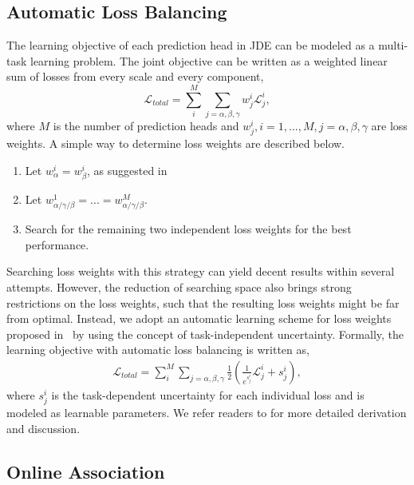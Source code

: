 \documentclass[runningheads]{llncs}
\begin{document}
\subsection{Automatic Loss Balancing}
\label{sec:lossbalancing}
The learning objective of each prediction head in JDE can be modeled as a multi-task learning problem. The joint objective can be written as a weighted linear sum of losses from every scale and every component,
\begin{equation}
    \mathcal{L}_{total} = \sum_{i}^M \sum_{j=\alpha, \beta, \gamma} w_{j}^{i} \mathcal{L}_{j}^{i},
\end{equation}
where $M$ is the number of prediction heads and $w_j^i, i=1,...,M, j=\alpha, \beta, \gamma$ are loss weights. 
A simple way to determine loss weights are described below.
\begin{enumerate}\item Let $w_\alpha^i = w_\beta^i$, as suggested in~\cite{faster}
    \item Let $w_{\alpha/\gamma/\beta}^1 = ... = w_{\alpha/\gamma/\beta}^M$.
    \item Search for the remaining two independent loss weights for the best performance.
\end{enumerate}
Searching loss weights with this strategy can yield decent results within several attempts. However, the reduction of searching space also brings strong restrictions on the loss weights, such that the resulting loss weights might be far from optimal. 
Instead, we adopt an automatic learning scheme for loss weights proposed in~\cite{uncertainty} by using the concept of task-independent uncertainty. Formally, the learning objective with automatic loss balancing is written as,
\begin{equation}
\begin{aligned}
        \mathcal{L}_{total} = \sum_{i}^M \sum_{j=\alpha, \beta, \gamma}\frac{1}{2}\left( \frac{1}{e ^{s_{j}^i}} \mathcal{L}_{j}^{i} 
         +  s_{j}^i \right),
\end{aligned}
\end{equation}
where $s_j^{i}$ is the task-dependent uncertainty for each individual loss and is modeled as learnable parameters. We refer readers to \cite{uncertainty} for more detailed derivation and discussion.

\subsection{Online Association}
\label{sec:association}
\end{document}
